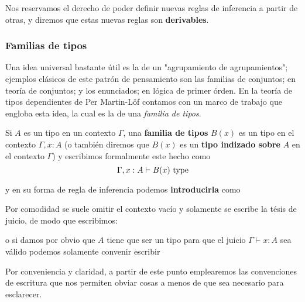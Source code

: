 \documentclass{article}
\begin{document}
        Nos reservamos el derecho de poder definir nuevas reglas de inferencia a partir de otras, y diremos que estas nuevas reglas son \textbf{derivables}.
    
    \subsubsection{Familias de tipos}
        Una idea universal bastante útil es la de un "agrupamiento de agrupamientos"; ejemplos clásicos de este patrón de pensamiento son
        las familias de conjuntos; en teoría de conjuntos; y los enunciados; en lógica de primer órden. En la teoría de tipos dependientes
        de Per Martin-Löf contamos con un marco de trabajo que engloba esta idea, la cual es la de una \textit{familia de tipos}.

        \begin{definition}\label{def:familia_tipos}
            Si $A$ es un tipo en un contexto $\Gamma$, una \textbf{familia de tipos} $B(x)$ es un tipo en el contexto $\Gamma, x : A$ (o también diremos
            que $B(x)$ es un \textbf{tipo indizado sobre} $A$ en el contexto $\Gamma$) y
            escribimos formalmente este hecho como
            $$
                \Gamma, x : A \vdash B(x)\ \type
            $$

            y en su forma de regla de inferencia podemos \textbf{introducirla} como
            \begin{prooftree}
            \end{prooftree}

            Por comodidad se suele omitir el contexto vacío y solamente se escribe la tésis de juicio, de modo que escribimos:

            \begin{prooftree}
            \end{prooftree}

            o si damos por obvio que $A$ tiene que ser un tipo para que el juicio $\Gamma \vdash x : A$ sea válido podemos solamente convenir escribir
            \begin{prooftree}
            \end{prooftree}
        
            Por conveniencia y claridad, a partir de este punto emplearemos las convenciones de escritura que nos permiten obviar cosas a menos de que sea
            necesario para esclarecer.
        \end{definition}
\end{document}
